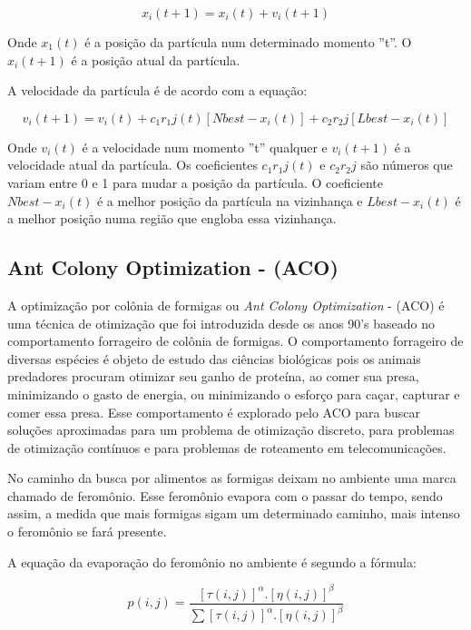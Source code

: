 \documentclass[conference,compsoc]{IEEEtran}
\begin{document}
\begin{equation}
x_i(t+1) = x_i(t) + v_i(t+1)
\end{equation}

Onde $x_1(t)$ é a posição da partícula num determinado momento ''t''. O $x_i(t+1) $ é a posição atual da partícula.

A velocidade da partícula é de acordo com a equação:

\begin{equation}
v_i(t+1) = v_i(t) + c_1r_1j(t)[Nbest - x_i(t)] + c_2r_2j[Lbest - x_i(t)]
\end{equation}

Onde $v_i(t)$ é a velocidade num momento ''t'' qualquer e $v_i(t+1)$ é a velocidade atual da partícula.
Os coeficientes $c_1r_1j(t)$ e $c_2r_2j$ são números que variam entre 0 e 1 para mudar a posição da partícula.
O coeficiente $Nbest - x_i(t)$ é a melhor posição da partícula na vizinhança e $Lbest - x_i(t)$ é a melhor posição
numa região que engloba essa vizinhança.

\subsection{Ant Colony Optimization - (ACO) }\label{arte:algo:aco}

A optimização por colônia de formigas ou \textit{Ant Colony Optimization} - (ACO) é uma técnica de otimização que foi
introduzida desde os anos 90's \cite{Blum2005} baseado no comportamento forrageiro de colônia de formigas.
O comportamento forrageiro de diversas espécies \cite{Dorigo2005} é objeto de estudo das ciências biológicas pois os animais predadores 
procuram otimizar seu ganho de proteína, ao comer sua presa, minimizando o gasto de energia, ou minimizando o esforço para
caçar, capturar e comer essa presa. Esse comportamento é explorado pelo ACO para buscar soluções aproximadas para um
problema de otimização discreto, para problemas de otimização contínuos e para problemas de roteamento em telecomunicações.

No caminho da busca por alimentos as formigas deixam no ambiente uma marca chamado de feromônio.
Esse feromônio evapora com o passar do tempo, sendo assim, a medida que mais formigas sigam um determinado caminho,
mais intenso o feromônio se fará presente. 

A equação da evaporação do feromônio no ambiente é segundo a fórmula:

\begin{equation}
p(i,j)= \frac{[\tau (i,j)]^{\alpha }.[\eta (i,j)]^{\beta}}{\sum [\tau (i,j)]^{\alpha }.[\eta (i,j)]^{\beta}}
\end{equation}
\end{document}

